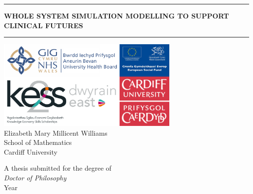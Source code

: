 \documentclass[../thesis.tex]{subfiles}
\begin{document}
\thispagestyle{empty} %
\calccentering{\unitlength}
\centering
\vspace*{0.05\textheight} %

\rule{\textwidth}{0.4pt}%
\vspace{1\baselineskip} 
{\LARGE \textbf{WHOLE SYSTEM SIMULATION MODELLING TO SUPPORT CLINICAL FUTURES}}
\vspace{0.75\baselineskip} %
\rule{\textwidth}{0.4pt}\vspace*{-\baselineskip}\vspace{3.2pt}
\vfill
\includegraphics[width =90mm]{includes/Combined images.png}\\
\vfill
{\Large Elizabeth Mary Millicent Williams}\\
\vspace{0.75\baselineskip} 
{\Large School of Mathematics}\\
\vspace{0.75\baselineskip} 
{\Large Cardiff University}
\vfill

{\Large A thesis submitted for the degree of\\[0.35em] \textit{Doctor of Philosophy}}\\
\vfill
{\Large Year}      %

\end{document}
